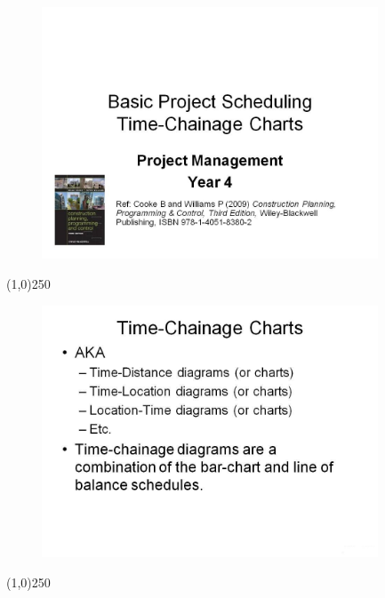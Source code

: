 \begin{frame}
\begin{figure}
	\centering
		\includegraphics[width = 10.0cm]{oldnotes/Slide299.jpg}
\end{figure}
\end{frame}
\begin{center}\line(1,0){250}\end{center}





\begin{frame}
\begin{figure}
	\centering
		\includegraphics[width = 10.0cm]{oldnotes/Slide300.jpg}
\end{figure}
\end{frame}
\begin{center}\line(1,0){250}\end{center}




